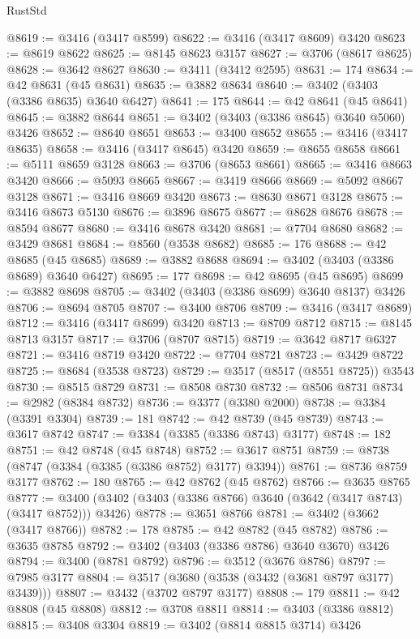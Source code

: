 \begin{lexlean}{RustStd}
\begin{coremodule}
@8619 := @3416 (@3417 @8599)
@8622 := @3416 (@3417 @8609) @3420
@8623 := @8619 @8622
@8625 := @8145 @8623 @3157
@8627 := @3706 (@8617 @8625)
@8628 := @3642 @8627
@8630 := @3411 (@3412 @2595)
@8631 := 174
@8634 := @42 @8631 (@45 @8631)
@8635 := @3882 @8634
@8640 := @3402 (@3403 (@3386 @8635) @3640 @6427)
@8641 := 175
@8644 := @42 @8641 (@45 @8641)
@8645 := @3882 @8644
@8651 := @3402 (@3403 (@3386 @8645) @3640 @5060) @3426
@8652 := @8640 @8651
@8653 := @3400 @8652
@8655 := @3416 (@3417 @8635)
@8658 := @3416 (@3417 @8645) @3420
@8659 := @8655 @8658
@8661 := @5111 @8659 @3128
@8663 := @3706 (@8653 @8661)
@8665 := @3416 @8663 @3420
@8666 := @5093 @8665
@8667 := @3419 @8666
@8669 := @5092 @8667 @3128
@8671 := @3416 @8669 @3420
@8673 := @8630 @8671 @3128
@8675 := @3416 @8673 @5130
@8676 := @3896 @8675
@8677 := @8628 @8676
@8678 := @8594 @8677
@8680 := @3416 @8678 @3420
@8681 := @7704 @8680
@8682 := @3429 @8681
@8684 := @8560 (@3538 @8682)
@8685 := 176
@8688 := @42 @8685 (@45 @8685)
@8689 := @3882 @8688
@8694 := @3402 (@3403 (@3386 @8689) @3640 @6427)
@8695 := 177
@8698 := @42 @8695 (@45 @8695)
@8699 := @3882 @8698
@8705 := @3402 (@3403 (@3386 @8699) @3640 @8137) @3426
@8706 := @8694 @8705
@8707 := @3400 @8706
@8709 := @3416 (@3417 @8689)
@8712 := @3416 (@3417 @8699) @3420
@8713 := @8709 @8712
@8715 := @8145 @8713 @3157
@8717 := @3706 (@8707 @8715)
@8719 := @3642 @8717 @6327
@8721 := @3416 @8719 @3420
@8722 := @7704 @8721
@8723 := @3429 @8722
@8725 := @8684 (@3538 @8723)
@8729 := @3517 (@8517 (@8551 @8725)) @3543
@8730 := @8515 @8729
@8731 := @8508 @8730
@8732 := @8506 @8731
@8734 := @2982 (@8384 @8732)
@8736 := @3377 (@3380 @2000)
@8738 := @3384 (@3391 @3304)
@8739 := 181
@8742 := @42 @8739 (@45 @8739)
@8743 := @3617 @8742
@8747 := @3384 (@3385 (@3386 @8743) @3177)
@8748 := 182
@8751 := @42 @8748 (@45 @8748)
@8752 := @3617 @8751
@8759 := @8738 (@8747 (@3384 (@3385 (@3386 @8752) @3177) @3394))
@8761 := @8736 @8759 @3177
@8762 := 180
@8765 := @42 @8762 (@45 @8762)
@8766 := @3635 @8765
@8777 := @3400 (@3402 (@3403 (@3386 @8766) @3640 (@3642 (@3417 @8743) (@3417 @8752))) @3426)
@8778 := @3651 @8766
@8781 := @3402 (@3662 (@3417 @8766))
@8782 := 178
@8785 := @42 @8782 (@45 @8782)
@8786 := @3635 @8785
@8792 := @3402 (@3403 (@3386 @8786) @3640 @3670) @3426
@8794 := @3400 (@8781 @8792)
@8796 := @3512 (@3676 @8786)
@8797 := @7985 @3177
@8804 := @3517 (@3680 (@3538 (@3432 (@3681 @8797 @3177) @3439)))
@8807 := @3432 (@3702 @8797 @3177)
@8808 := 179
@8811 := @42 @8808 (@45 @8808)
@8812 := @3708 @8811
@8814 := @3403 (@3386 @8812)
@8815 := @3408 @3304
@8819 := @3402 (@8814 @8815 @3714) @3426

\end{coremodule}
\end{lexlean}
